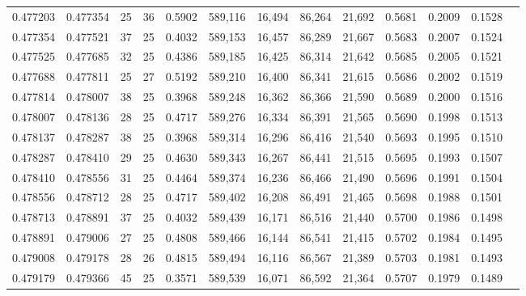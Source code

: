 \begin{tabular}{rrrrrrrrrrrrr}
0.477203 & 0.477354 &    25 &  36 &                                     0.5902 & 589,116 &  16,494 &  86,264 &  21,692 & 0.5681 & 0.2009 & 0.1528 \\
0.477354 & 0.477521 &    37 &  25 &                                     0.4032 & 589,153 &  16,457 &  86,289 &  21,667 & 0.5683 & 0.2007 & 0.1524 \\
0.477525 & 0.477685 &    32 &  25 &                                     0.4386 & 589,185 &  16,425 &  86,314 &  21,642 & 0.5685 & 0.2005 & 0.1521 \\
0.477688 & 0.477811 &    25 &  27 &                                     0.5192 & 589,210 &  16,400 &  86,341 &  21,615 & 0.5686 & 0.2002 & 0.1519 \\
0.477814 & 0.478007 &    38 &  25 &                                     0.3968 & 589,248 &  16,362 &  86,366 &  21,590 & 0.5689 & 0.2000 & 0.1516 \\
0.478007 & 0.478136 &    28 &  25 &                                     0.4717 & 589,276 &  16,334 &  86,391 &  21,565 & 0.5690 & 0.1998 & 0.1513 \\
0.478137 & 0.478287 &    38 &  25 &                                     0.3968 & 589,314 &  16,296 &  86,416 &  21,540 & 0.5693 & 0.1995 & 0.1510 \\
0.478287 & 0.478410 &    29 &  25 &                                     0.4630 & 589,343 &  16,267 &  86,441 &  21,515 & 0.5695 & 0.1993 & 0.1507 \\
0.478410 & 0.478556 &    31 &  25 &                                     0.4464 & 589,374 &  16,236 &  86,466 &  21,490 & 0.5696 & 0.1991 & 0.1504 \\
0.478556 & 0.478712 &    28 &  25 &                                     0.4717 & 589,402 &  16,208 &  86,491 &  21,465 & 0.5698 & 0.1988 & 0.1501 \\
0.478713 & 0.478891 &    37 &  25 &                                     0.4032 & 589,439 &  16,171 &  86,516 &  21,440 & 0.5700 & 0.1986 & 0.1498 \\
0.478891 & 0.479006 &    27 &  25 &                                     0.4808 & 589,466 &  16,144 &  86,541 &  21,415 & 0.5702 & 0.1984 & 0.1495 \\
0.479008 & 0.479178 &    28 &  26 &                                     0.4815 & 589,494 &  16,116 &  86,567 &  21,389 & 0.5703 & 0.1981 & 0.1493 \\
0.479179 & 0.479366 &    45 &  25 &                                     0.3571 & 589,539 &  16,071 &  86,592 &  21,364 & 0.5707 & 0.1979 & 0.1489 \\

\end{tabular}
